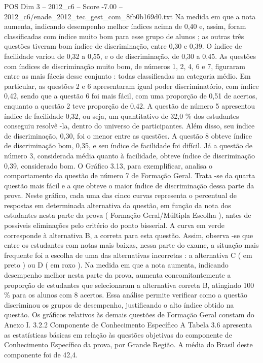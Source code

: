 \begin{textsample}{POS Dim 3 – 2012\_c6 – Score -7.00 – 2012\_c6/enade\_2012\_tec\_gest\_com\_8fb0b169d0.txt}
Na medida em que a nota aumenta, indicando desempenho melhor índices acima de 0,40 e, assim, foram classificadas com índice muito bom para esse grupo de alunos ; as outras três questões tiveram bom índice de discriminação, entre 0,30 e 0,39.
O índice de facilidade variou de 0,32 a 0,55, e o de discriminação, de 0,30 a 0,45.
As questões com índices de discriminação muito bom, de números 1, 2, 4, 6 e 7, figuraram entre as mais fáceis desse conjunto : todas classificadas na categoria médio.
Em particular, as questões 2 e 6 apresentaram igual poder discriminatório, com índice 0,42, sendo que a questão 6 foi mais fácil, com uma proporção de 0,51 de acertos, enquanto a questão 2 teve proporção de 0,42.
A questão de número 5 apresentou índice de facilidade 0,32, ou seja, um quantitativo de 32,0 \% dos estudantes conseguiu resolvê -la, dentro do universo de participantes.
Além disso, seu índice de discriminação, 0,30, foi o menor entre as questões.
A questão 8 obteve índice de discriminação bom, 0,35, e seu índice de facilidade foi difícil.
Já a questão de número 3, considerada média quanto à facilidade, obteve índice de discriminação 0,39, considerado bom.
O Gráfico 3.13, para exemplificar, analisa o comportamento da questão de número 7 de Formação Geral.
Trata -se da quarta questão mais fácil e a que obteve o maior índice de discriminação dessa parte da prova.
Neste gráfico, cada uma das cinco curvas representa o percentual de respostas em determinada alternativa da questão, em função da nota dos estudantes nesta parte da prova ( Formação Geral/Múltipla Escolha ), antes de possíveis eliminações pelo critério do ponto bisserial.
A curva em verde corresponde à alternativa B, a correta para esta questão.
Assim, observa -se que entre os estudantes com notas mais baixas, nessa parte do exame, a situação mais frequente foi a escolha de uma das alternativas incorretas : a alternativa C ( em preto ) ou D ( em roxo ).
Na medida em que a nota aumenta, indicando desempenho melhor nesta parte da prova, aumenta concomitantemente a proporção de estudantes que selecionaram a alternativa correta B, atingindo 100 \% para os alunos com 8 acertos.
Essa análise permite verificar como a questão discriminou os grupos de desempenho, justificando o alto índice obtido na questão.
Os gráficos relativos às demais questões de Formação Geral constam do Anexo I. 3.2.2 Componente de Conhecimento Específico A Tabela 3.6 apresenta as estatísticas básicas em relação às questões objetivas do componente de Conhecimento Específico da prova, por Grande Região.
A média do Brasil deste componente foi de 42,4.

\end{textsample}
